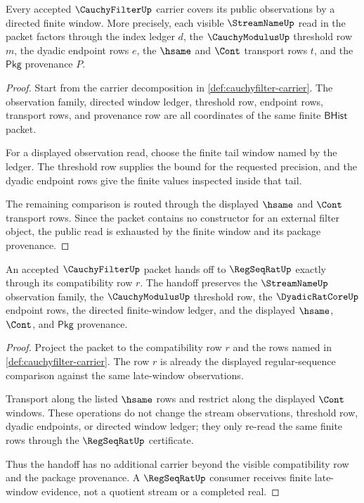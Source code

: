 \begin{theorem}\label{thm:cauchyfilter-finite-window-coverage}
Every accepted $\CauchyFilterUp$ carrier covers its public observations by a
directed finite window. More precisely, each visible $\StreamNameUp$ read in
the packet factors through the index ledger $d$, the $\CauchyModulusUp$
threshold row $m$, the dyadic endpoint rows $e$, the $\hsame$ and $\Cont$
transport rows $t$, and the $\mathsf{Pkg}$ provenance $P$.
\end{theorem}
\begin{proof}
Start from the carrier decomposition in
\autoref{def:cauchyfilter-carrier}. The observation family, directed window
ledger, threshold row, endpoint rows, transport rows, and provenance row are
all coordinates of the same finite $\mathsf{BHist}$ packet.

For a displayed observation read, choose the finite tail window named by the
ledger. The threshold row supplies the bound for the requested precision, and
the dyadic endpoint rows give the finite values inspected inside that tail.

The remaining comparison is routed through the displayed $\hsame$ and $\Cont$
transport rows. Since the packet contains no constructor for an external
filter object, the public read is exhausted by the finite window and its
package provenance.
\end{proof}

\begin{theorem}\label{thm:cauchyfilter-regseqrat-handoff}
An accepted $\CauchyFilterUp$ packet hands off to $\RegSeqRatUp$ exactly
through its compatibility row $r$. The handoff preserves the
$\StreamNameUp$ observation family, the $\CauchyModulusUp$ threshold row, the
$\DyadicRatCoreUp$ endpoint rows, the directed finite-window ledger, and the
displayed $\hsame$, $\Cont$, and $\mathsf{Pkg}$ provenance.
\end{theorem}
\begin{proof}
Project the packet to the compatibility row $r$ and the rows named in
\autoref{def:cauchyfilter-carrier}. The row $r$ is already the displayed
regular-sequence comparison against the same late-window observations.

Transport along the listed $\hsame$ rows and restrict along the displayed
$\Cont$ windows. These operations do not change the stream observations,
threshold row, dyadic endpoints, or directed window ledger; they only re-read
the same finite rows through the $\RegSeqRatUp$ certificate.

Thus the handoff has no additional carrier beyond the visible compatibility
row and the package provenance. A $\RegSeqRatUp$ consumer receives finite
late-window evidence, not a quotient stream or a completed real.
\end{proof}

